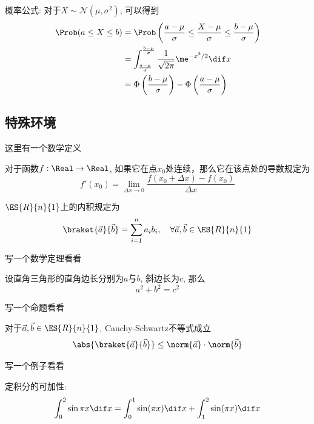 概率公式: 对于$X\sim \mathcal{N}(\mu, \sigma^2)$, 可以得到
\begin{align}
\Prob(a \le X \le b) 
&=\Prob\left(\frac{a-\mu}{\sigma}\le \frac{X-\mu}{\sigma}\le
  \frac{b-\mu}{\sigma} \right) \\
&= \int^{\frac{b-\mu}{\sigma}}_{\frac{a-\mu}{\sigma}} \frac{1}{\sqrt{2\pi}}\me^{-x^2/2}\dif x \\
& = \Phi\left(\frac{b-\mu}{\sigma}\right) - \Phi\left(\frac{a-\mu}{\sigma}\right) 
\end{align}


\subsection{特殊环境}


这里有一个数学定义
\begin{definition}
对于函数$f: \Real \to \Real$, 如果它在点$x_0$处连续，那么它在该点处的导数规定为
\begin{equation}
f'(x_0) = \lim_{\Delta x\to 0} \frac{f(x_0 + \Delta x) - f(x_0)}{\Delta x}
\end{equation}
\end{definition}

\begin{definition}[内积]
$\ES{R}{n}{1}$上的内积规定为
\begin{equation}
\braket{\vec{a}}{\vec{b}} = \sum^n_{i=1} a_ib_i, \quad \forall \vec{a}, \vec{b}\in \ES{R}{n}{1}
\end{equation}
\end{definition}

写一个数学定理看看
\begin{theorem}
设直角三角形的直角边长分别为$a$与$b$, 斜边长为$c$, 那么
\begin{equation}
a^2 + b^2 = c^2
\end{equation}
\end{theorem}


写一个命题看看
\begin{proposition}
对于$\vec{a},\vec{b}\in \ES{R}{n}{1}$, Cauchy-Schwartz不等式成立
\begin{equation}
\abs{\braket{\vec{a}}{\vec{b}}}\le \norm{\vec{a}}\cdot \norm{\vec{b}}
\end{equation}
\end{proposition}



写一个例子看看

\begin{example}
定积分的可加性:
$$
\int^2_0 \sin \pi x \dif x = \int^1_0 \sin(\pi x) \dif x + \int^2_1 \sin(\pi x) \dif x
$$
\end{example}

